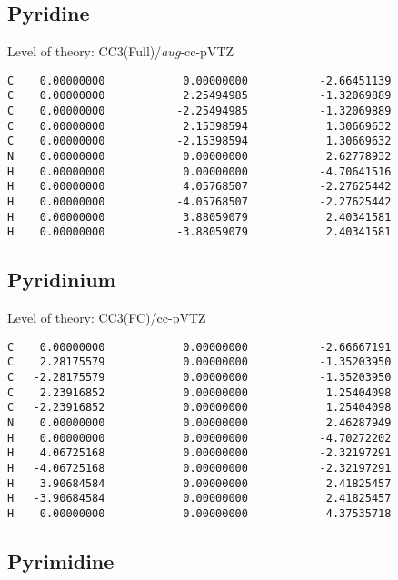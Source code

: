\documentclass[journal=jctcce,manuscript=article,layout=traditional]{achemso}
\newcommand{\TZ}{cc-pVTZ}
\newcommand{\AVTZ}{\emph{aug}-cc-pVTZ}
\begin{document}
\subsection*{Pyridine}

\begin{singlespace}
Level of theory: CC3(Full)/{\AVTZ}
\begin{verbatim}
C    0.00000000            0.00000000           -2.66451139
C    0.00000000            2.25494985           -1.32069889
C    0.00000000           -2.25494985           -1.32069889
C    0.00000000            2.15398594            1.30669632
C    0.00000000           -2.15398594            1.30669632
N    0.00000000            0.00000000            2.62778932
H    0.00000000            0.00000000           -4.70641516
H    0.00000000            4.05768507           -2.27625442
H    0.00000000           -4.05768507           -2.27625442 
H    0.00000000            3.88059079            2.40341581
H    0.00000000           -3.88059079            2.40341581
\end{verbatim}
\end{singlespace}

\subsection*{Pyridinium}

\begin{singlespace}
Level of theory: CC3(FC)/{\TZ}
\begin{verbatim}
C    0.00000000            0.00000000           -2.66667191
C    2.28175579            0.00000000           -1.35203950
C   -2.28175579            0.00000000           -1.35203950
C    2.23916852            0.00000000            1.25404098
C   -2.23916852            0.00000000            1.25404098
N    0.00000000            0.00000000            2.46287949
H    0.00000000            0.00000000           -4.70272202
H    4.06725168            0.00000000           -2.32197291
H   -4.06725168            0.00000000           -2.32197291
H    3.90684584            0.00000000            2.41825457
H   -3.90684584            0.00000000            2.41825457
H    0.00000000            0.00000000            4.37535718
\end{verbatim}
\end{singlespace}

\subsection*{Pyrimidine}
\end{document}
